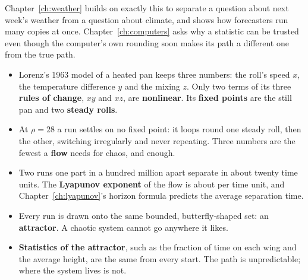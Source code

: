 Chapter~\ref{ch:weather} builds on exactly this to separate a question about
next week's weather from a question about climate, and shows how forecasters
run many copies at once. Chapter~\ref{ch:computers} asks why a statistic can
be trusted even though the computer's own rounding soon makes its path a
different one from the true path.

\begin{summarybox}
\begin{itemize}
\item Lorenz's 1963 model of a heated pan keeps three numbers: the roll's
  speed $x$, the temperature difference $y$ and the mixing $z$. Only two
  terms of its three \textbf{rules of change}, $xy$ and $xz$, are
  \textbf{nonlinear}. Its \textbf{fixed points} are the still pan and two
  \textbf{steady rolls}.
\item At $\rho = 28$ a run settles on no fixed point: it loops round one
  steady roll, then the other, switching irregularly and never repeating.
  Three numbers are the fewest a \textbf{flow} needs for chaos, and enough.
\item Two runs one part in a hundred million apart separate in about twenty
  time units. The \textbf{Lyapunov exponent} of the flow is about
   per time unit, and Chapter~\ref{ch:lyapunov}'s horizon
  formula predicts the average separation time.
\item Every run is drawn onto the same bounded, butterfly-shaped set: an
  \textbf{attractor}. A chaotic system cannot go anywhere it likes.
\item \textbf{Statistics of the attractor}, such as the fraction of time on
  each wing and the average height, are the same from every start. The path
  is unpredictable; where the system lives is not.
\end{itemize}
\end{summarybox}

\canyou


